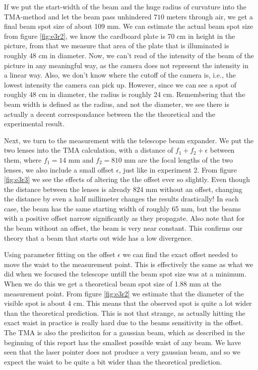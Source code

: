 \documentclass[a4paper, 11pt, notitlepage, english]{article}
\newcommand{\eps}{\epsilon}
\begin{document}
If we put the start-width of the beam and the huge radius of curvature into the TMA-method and let the beam pass unhindered $710$ meters through air, we get a final beam spot size of about 109 mm. We can estimate the actual beam spot size from figure \ref{fig:e3r2}, we know the cardboard plate is 70 cm in height in the picture, from that we measure that area of the plate that is illuminated is roughly 48 cm in diameter. Now, we can't read of the intensity of the beam of the picture in any meaningful way, as the camera does not represent the intensity in a linear way. Also, we don't know where the cutoff of the camera is, i.e., the lowest intensity the camera can pick up. However, since we can see a spot of roughly 48 cm in diameter, the radius is roughly 24 cm. Remembering that the beam width is defined as the radius, and not the diameter, we see there is actually a decent correspondance between the the theoretical and the experimental result.

Next, we turn to the measurement with the telescope beam expander. We put the two lenses into the TMA calculation, with a distance of $f_1+f_2+\eps$ between them, where $f_1=14$ mm and $f_2=810$ mm are the focal lengths of the two lenses, we also include a small offset $\eps$, just like in experiment 2. From figure \ref{fig:e3r3} we see the effects of altering the the offset ever so slightly. Even though the distance between the lenses is already $824$ mm without an offset, changing the distance by even a half millimeter changes the results drastically! In each case, the beam has the same starting width of roughly 65 mm, but the beams with a positive offset narrow significantly as they propagate. Also note that for the beam without an offset, the beam is very near constant. This confirms our theory that a beam that starts out wide has a low divergence. 

Using parameter fitting on the offset $\eps$ we can find the exact offset needed to move the waist to the measurement point. This is effectively the same as what we did when we focused the telescope untill the beam spot size was at a minimum. When we do this we get a theoretical beam spot size of 1.88 mm at the measurement point. From figure \ref{fig:e3r2} we estimate that the diameter of the visible spot is about 4 cm. This means that the observed spot is quite a lot wider than the theoretical prediction. This is not that strange, as actually hitting the exact waist in practice is really hard due to the beams sensitivity in the offset. The TMA is also the prediciton for a gaussian beam, which as described in the beginning of this report has the smallest possible waist of any beam. We have seen that the laser pointer does not produce a very gaussian beam, and so we expect the waist to be quite a bit wider than the theoretical prediction.
\end{document}
